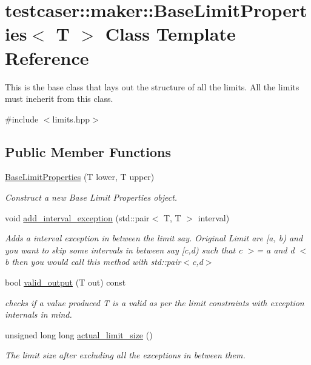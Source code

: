 \hypertarget{classtestcaser_1_1maker_1_1BaseLimitProperties}{}\section{testcaser\+::maker\+::Base\+Limit\+Properties$<$ T $>$ Class Template Reference}
\label{classtestcaser_1_1maker_1_1BaseLimitProperties}


This is the base class that lays out the structure of all the limits. All the limits must ineherit from this class.  




{\ttfamily \#include $<$limits.\+hpp$>$}

\subsection*{Public Member Functions}
\begin{DoxyCompactItemize}
\item 
\mbox{\hyperlink{classtestcaser_1_1maker_1_1BaseLimitProperties_a1022e529219cf4e212055bdbb25c4027}{Base\+Limit\+Properties}} (T lower, T upper)
\begin{DoxyCompactList}\small\item\em Construct a new Base Limit Properties object. \end{DoxyCompactList}\item 
void \mbox{\hyperlink{classtestcaser_1_1maker_1_1BaseLimitProperties_ae861156476caee223b806ea3d160040a}{add\+\_\+interval\+\_\+exception}} (std\+::pair$<$ T, T $>$ interval)
\begin{DoxyCompactList}\small\item\em Adds a interval exception in between the limit say. Original Limit are \mbox{[}a, b) and you want to skip some intervals in between say \mbox{[}c,d) such that c $>$= a and d $<$ b then you would call this method with std\+::pair$<$c,d$>$ \end{DoxyCompactList}\item 
bool \mbox{\hyperlink{classtestcaser_1_1maker_1_1BaseLimitProperties_a85f2967e2b73ff5fec2bc0053311d5e0}{valid\+\_\+output}} (T out) const
\begin{DoxyCompactList}\small\item\em checks if a value produced T is a valid as per the limit constraints with exception internals in mind. \end{DoxyCompactList}\item 
unsigned long long \mbox{\hyperlink{classtestcaser_1_1maker_1_1BaseLimitProperties_a1b8a120b2230476fc4fc97d4720fd3e5}{actual\+\_\+limit\+\_\+size}} ()
\begin{DoxyCompactList}\small\item\em The limit size after excluding all the exceptions in between them. \end{DoxyCompactList}\end{DoxyCompactItemize}
